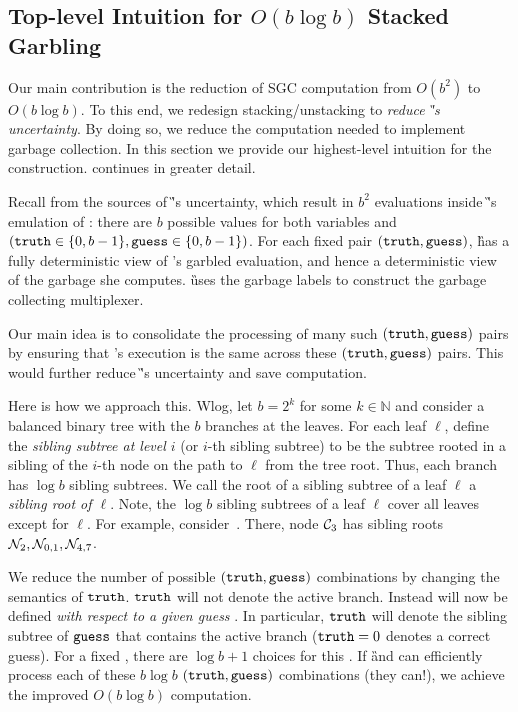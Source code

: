 \subsection{Top-level Intuition for $O(b \log b)$ Stacked Garbling}
\label{sec:intuition}

Our main contribution is the reduction of SGC computation from
$O(b^2)$ to $O(b \log b)$.  To this end, we redesign
stacking/unstacking to \emph{reduce \G's
uncertainty}.
%
By doing so, we reduce the computation needed to implement garbage
collection.
%
In this section we provide our highest-level intuition for the
construction.  continues in greater detail.

Recall from  the  sources of \G's
uncertainty, which result in $b^2$ evaluations inside \G's emulation
of \E: there are $b$ possible values for both variables \truth and \guess
$(\mathtt{truth} \in\{0,b-1\}, \mathtt{guess}\in\{0,b-1\})$.
%
For each fixed pair  $(\mathtt{truth},\mathtt{guess})$, \G has a fully
deterministic view of \E's garbled evaluation, and hence a deterministic view of
the garbage she computes.
\G uses the garbage labels to construct the garbage collecting multiplexer.

Our main idea is to consolidate the processing of many
such $(\mathtt{truth},\mathtt{guess})$ pairs by ensuring that \E's execution is the
same across these $(\mathtt{truth},\mathtt{guess})$ pairs.  This would further reduce \G's
uncertainty and save computation.

Here is how we approach this.
Wlog, let $b = 2^k$ for some $k \in \mathbb{N}$ and consider a balanced
binary tree with the $b$ branches at the leaves.
For each leaf $\ell$, define the {\em sibling subtree at level $i$} (or
$i$-th  sibling subtree) to be the subtree rooted in a sibling of the
$i$-th node on the path to $\ell$ from the tree root.  Thus, each branch
has $\log b$ sibling subtrees.
We call the root of a
sibling subtree of a leaf $\ell$ a {\em sibling root of $\ell$}.
Note, the $\log b$ sibling subtrees of a leaf $\ell$ 
cover all leaves except for $\ell$.
For example, consider~.
There, node $\mathcal C_3$ has sibling roots $\mathtt{\cal N}_2, \mathtt{\cal N}_{0,1},
\mathtt{\cal N}_{4,7}$.

We reduce the number of possible $(\mathtt{truth}, \mathtt{guess})$ combinations by
changing the semantics of $\mathtt{truth}$.
$\mathtt{truth}$ will not denote the active branch. Instead \truth will
now be defined \emph{with respect to a given guess} \guess.
In particular, $\mathtt{truth}$ will denote the sibling subtree of $\mathtt{guess}$
that contains the active branch ($\mathtt{truth} = 0$ denotes a correct
guess).
For a fixed \guess, there are $\log b + 1$
choices for this \truth.  If \G and \E can efficiently process each
of these $b\log b$  $(\mathtt{truth},\mathtt{guess})$ combinations  (they
can!), we achieve the improved $O(b\log b)$ computation.
